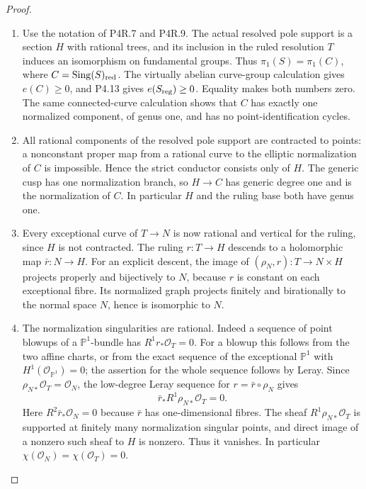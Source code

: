 \begin{proof}

\begin{enumerate}[label={$\langle1\rangle$\arabic*.},leftmargin=*]
\item Use the notation of P4R.7 and P4R.9.
The actual resolved pole support is
a section $H$ with rational trees,
and its inclusion in the ruled
resolution $T$ induces an isomorphism
on fundamental groups. Thus
$\pi_1(S)=\pi_1(C)$, where
$C=\operatorname{Sing}(S)_{\rm red}$.
The virtually abelian curve-group
calculation gives $e(C)\ge0$, and
P4.13 gives $e(S_{\rm reg})\ge0$.
Equality makes both numbers zero.
The same connected-curve calculation
shows that $C$ has exactly one
normalized component, of genus one,
and has no point-identification
cycles.

\item All rational components of the
resolved pole support are contracted
to points: a nonconstant proper map
from a rational curve to the
elliptic normalization of $C$ is
impossible. Hence the strict
conductor consists only of $H$.
The generic cusp has one
normalization branch, so
$H\to C$ has generic degree one
and is the normalization of $C$.
In particular $H$ and the ruling
base both have genus one.

\item Every exceptional curve of
$T\to N$ is now rational and
vertical for the ruling, since
$H$ is not contracted. The ruling
$r:T\to H$ descends to a holomorphic
map $\bar r:N\to H$. For an explicit
descent, the image of
$(\rho_N,r):T\to N\times H$
projects properly and bijectively
to $N$, because $r$ is constant
on each exceptional fibre. Its
normalized graph projects finitely
and birationally to the normal
space $N$, hence is isomorphic
to $N$.

\item The normalization singularities
are rational. Indeed a sequence
of point blowups of a
$\mathbb P^1$-bundle has
$R^1r_*\mathcal O_T=0$.
For a blowup this follows from
the two affine charts, or from
the exact sequence of the
exceptional $\mathbb P^1$ with
$H^1(\mathcal O_{\mathbb P^1})=0$;
the assertion for the whole
sequence follows by Leray.
Since $\rho_{N*}\mathcal O_T
=\mathcal O_N$, the low-degree
Leray sequence for
$r=\bar r\circ\rho_N$ gives
\[
 \bar r_*R^1\rho_{N*}\mathcal O_T=0.
\]
Here $R^2\bar r_*\mathcal O_N=0$
because $\bar r$ has one-dimensional
fibres. The sheaf
$R^1\rho_{N*}\mathcal O_T$ is
supported at finitely many
normalization singular points,
and direct image of a nonzero
such sheaf to $H$ is nonzero.
Thus it vanishes. In particular
$\chi(\mathcal O_N)
=\chi(\mathcal O_T)=0$.


\end{enumerate}
\end{proof}
